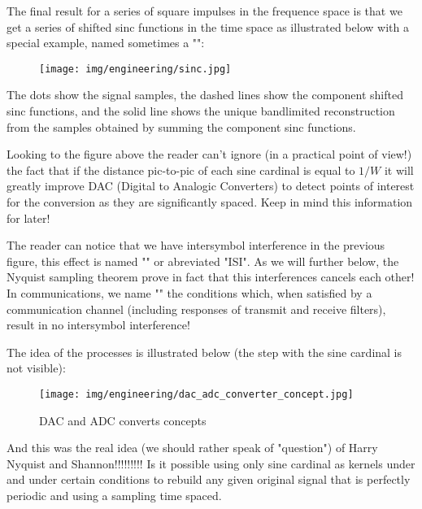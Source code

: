 	The final result for a series of square impulses in the frequence space is that we get a series of shifted sinc functions in the time space as illustrated below with a special example, named sometimes a "":
	\begin{figure}[H]
		\centering
		\texttt{[image: img/engineering/sinc.jpg]}
	\end{figure}
	The dots show the signal samples, the dashed lines show the component shifted sinc functions, and the solid line shows the unique bandlimited reconstruction from the samples obtained by summing the component sinc functions.
	
	Looking to the figure above the reader can't ignore (in a practical point of view!) the fact that if the distance pic-to-pic of each sine cardinal is equal to $1/W$ it will greatly improve DAC (Digital to Analogic Converters) to detect points of interest for the conversion as they are significantly spaced. Keep in mind this information for later!
	\begin{tcolorbox}[title=Remark,colframe=black,arc=10pt]
	The reader can notice that we have intersymbol interference in the previous figure, this effect is named "" or abreviated "ISI". As we will further below, the Nyquist sampling theorem prove in fact that this interferences cancels each other!\\
	
	In communications, we name "" the conditions which, when satisfied by a communication channel (including responses of transmit and receive filters), result in no intersymbol interference!
	\end{tcolorbox}
	The idea of the processes is illustrated below (the step with the sine cardinal is not visible):
	\begin{figure}[H]
		\centering
		\texttt{[image: img/engineering/dac\_adc\_converter\_concept.jpg]}
		\caption{DAC and ADC converts concepts}
	\end{figure}	
	And this was the real idea (we should rather speak of "question") of Harry Nyquist and Shannon!!!!!!!!! Is it possible using only sine cardinal as kernels under and under certain conditions to rebuild any given original signal that is perfectly periodic and using a sampling time spaced.
	
